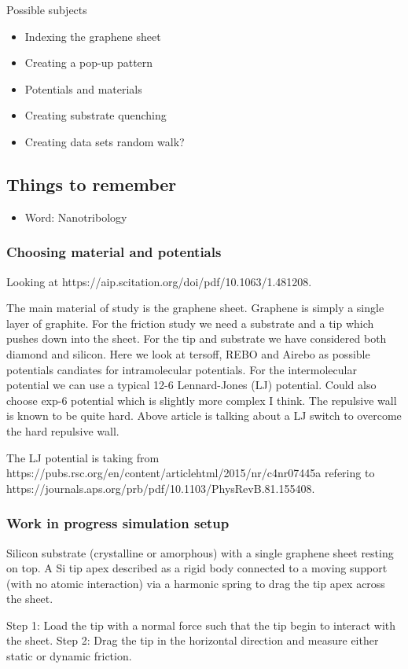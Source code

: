 Possible subjects
\begin{itemize}
    \item Indexing the graphene sheet
    \item Creating a pop-up pattern
    \item Potentials and materials
    \item Creating substrate
    \subitem quenching
    \item Creating data sets
    \subitem random walk?
\end{itemize}    


\subsection*{Things to remember}
\begin{itemize}
    \item Word: Nanotribology
\end{itemize}

\subsubsection*{Choosing material and potentials}

Looking at https://aip.scitation.org/doi/pdf/10.1063/1.481208.

The main material of study is the graphene sheet. Graphene is simply a single layer of graphite. For the friction study we need a substrate and a tip which pushes down into the sheet. For the tip and substrate we have considered both diamond and silicon. Here we look at tersoff, REBO and Airebo as possible potentials candiates for intramolecular potentials. For the intermolecular potential we can use a typical 12-6 Lennard-Jones (LJ) potential. Could also choose exp-6 potential which is slightly more complex I think. The repulsive wall is known to be quite hard. Above article is talking about a LJ switch to overcome the hard repulsive wall.  


The LJ potential is taking from https://pubs.rsc.org/en/content/articlehtml/2015/nr/c4nr07445a refering to https://journals.aps.org/prb/pdf/10.1103/PhysRevB.81.155408.


\subsubsection*{Work in progress simulation setup}
Silicon substrate (crystalline or amorphous) with a single graphene sheet resting on top. A Si tip apex described as a rigid body connected to a moving support (with no atomic interaction) via a harmonic spring to drag the tip apex across the sheet. \par
Step 1: Load the tip with a normal force such that the tip begin to interact with the sheet. Step 2: Drag the tip in the horizontal direction and measure either static or dynamic friction. 

